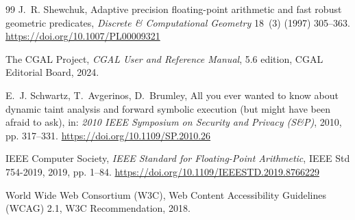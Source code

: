 \documentclass[preprint,12pt]{elsarticle}
\begin{document}
\begin{thebibliography}{99}
J.~R. Shewchuk, Adaptive precision floating-point arithmetic and fast robust geometric predicates, \textit{Discrete \& Computational Geometry} 18~(3) (1997) 305--363. \url{https://doi.org/10.1007/PL00009321}

The CGAL Project, \textit{CGAL User and Reference Manual}, 5.6 edition, CGAL Editorial Board, 2024.

E.~J. Schwartz, T.~Avgerinos, D.~Brumley, All you ever wanted to know about dynamic taint analysis and forward symbolic execution (but might have been afraid to ask), in: \textit{2010 IEEE Symposium on Security and Privacy (S\&P)}, 2010, pp. 317--331. \url{https://doi.org/10.1109/SP.2010.26}

IEEE Computer Society, \textit{IEEE Standard for Floating-Point Arithmetic}, IEEE Std 754-2019, 2019, pp. 1--84. \url{https://doi.org/10.1109/IEEESTD.2019.8766229}

World Wide Web Consortium (W3C), Web Content Accessibility Guidelines (WCAG) 2.1, W3C Recommendation, 2018.
\end{thebibliography}
\end{document}
